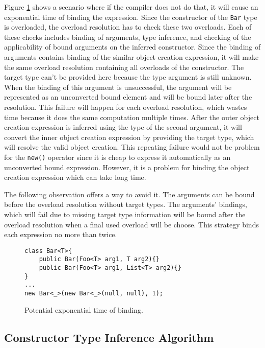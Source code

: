 \par
Figure \ref{img61:exp} shows a scenario where if the compiler does not do that, it will cause an exponential time of binding the expression. 
Since the constructor of the \texttt{Bar} type is overloaded, the overload resolution has to check these two overloads. 
Each of these checks includes binding of arguments, type inference, and checking of the applicability of bound arguments on the inferred constructor. 
Since the binding of arguments contains binding of the similar object creation expression, it will make the same overload resolution containing all overloads of the constructor. 
The target type can’t be provided here because the type argument is still unknown. 
When the binding of this argument is unsuccessful, the argument will be represented as an unconverted bound element and will be bound later after the resolution. 
This failure will happen for each overload resolution, which wastes time because it does the same computation multiple times. 
After the outer object creation expression is inferred using the type of the second argument, it will convert the inner object creation expression by providing the target type, which will resolve the valid object creation. 
This repeating failure would not be problem for the \texttt{new()} operator since it is cheap to express it automatically as an unconverted bound expression.
However, it is a problem for binding the object creation expression which can take long time.
\par
The following observation offers a way to avoid it.
The arguments can be bound before the overload resolution without target types.
The arguments' bindings, which will fail due to missing target type information will be bound after the overload resolution when a final used overload will be choose.
This strategy binds each expression no more than twice. 
\begin{figure}[h!]
\begin{lstlisting}[style=csharp, mathescape=true]
class Bar<T>{
    public Bar(Foo<T> arg1, T arg2){}
    public Bar(Foo<T> arg1, List<T> arg2){}
}
...
new Bar<_>(new Bar<_>(null, null), 1);
\end{lstlisting}
\caption{Potential exponential time of binding.}
\label{img61:exp}
\end{figure}

\subsection{Constructor Type Inference Algorithm}

